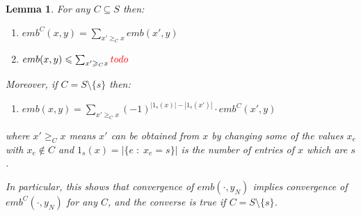 \documentclass[11pt,oneside,reqno]{article}
\theoremstyle{plain}
\newtheorem{lemma}[theorem]{Lemma}
\theoremstyle{definition}
\numberwithin{equation}{section}
\renewcommand{\leq}{\leqslant}
\renewcommand{\geq}{\geqslant}
\newcommand{\red}{\textcolor{red}}
\begin{document}
\begin{lemma}
    For any $C \subseteq S$ then:

    \begin{enumerate}[label=(\roman*)]
        \item $emb^C(x,y) = \sum_{x' \geq_C x} emb(x', y)$

        \item $emb(x,y) \leq \sum_{x' \geq_C x} \red{todo} $
    \end{enumerate}

    \noindent Moreover, if $C = S \setminus \{s\}$ then:

    \begin{enumerate}
        \item[(iii)]  $emb(x,y) = \sum_{x' \geq_C x} (-1)^{|1_s(x)| - |1_s(x')|} \cdot emb^C(x', y)$
    \end{enumerate}
    

    \noindent where $x' \geq_C x$ means $x'$ can be obtained from $x$ by changing some of the values $x_e$ with $x_e \notin C$ and $1_s(x) = | \{e \; : \; x_e = s\} |$ is the number of entries of $x$ which are $s$. 
    
    In particular, this shows that convergence of $emb(\cdot, y_N)$ implies convergence of $emb^C(\cdot, y_N)$ for any $C$, and the converse is true if $C = S \setminus \{s\}$. 

    \label{lem:weak_embeddings_for_nonbinary_arrays}
\end{lemma}
\end{document}
